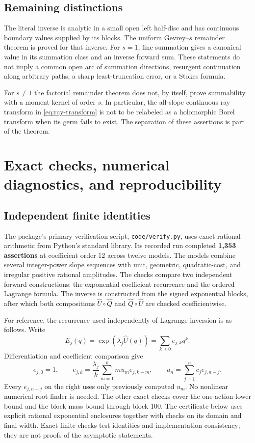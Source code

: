 \documentclass[11pt,a4paper]{article}
\numberwithin{equation}{section}
\theoremstyle{definition}
\theoremstyle{remark}
\theoremstyle{definition}
\newcommand{\U}{\widehat U}
\newcommand{\Q}{\widehat Q}
\begin{document}
\subsection{Remaining distinctions}
The literal inverse is analytic in a small open left half-disc and has
continuous boundary values supplied by its blocks. The uniform
Gevrey--$s$ remainder theorem is proved for that inverse. For $s=1$,
fine summation gives a canonical value in its summation class and an
inverse forward sum. These statements do not imply a common open arc
of summation directions, resurgent continuation along arbitrary paths,
a sharp least-truncation error, or a Stokes formula.

For $s\ne1$ the factorial remainder theorem does not, by itself, prove
summability with a moment kernel of order $s$. In particular, the
all-slope continuous ray transform in \eqref{eq:ray-transform} is not
to be relabeled as a holomorphic Borel transform when its germ fails
to exist. The separation of these assertions is part of the theorem.

\section{Exact checks, numerical diagnostics, and reproducibility}
\label{sec:verification}

\subsection{Independent finite identities}
The package's primary verification script, \texttt{code/verify.py},
uses exact rational arithmetic from Python's standard library. Its
recorded run completed \textbf{1,353 assertions} at coefficient order
12 across twelve models. The models combine several integer-power
slope sequences with unit, geometric, quadratic-cost, and irregular
positive rational amplitudes. The checks compare two independent
forward constructions: the exponential coefficient recurrence and the
ordered Lagrange formula. The inverse is constructed from the signed
exponential blocks, after which both compositions $\U\circ\Q$ and
$\Q\circ\U$ are checked coefficientwise.

For reference, the recurrence used independently of Lagrange inversion
is as follows. Write
\[
 E_j(q)=\exp(\lambda_j\U(q))=\sum_{k\ge0}e_{j,k}q^k.
\]
Differentiation and coefficient comparison give
\begin{equation}
 e_{j,0}=1,\qquad
 e_{j,k}=\frac{\lambda_j}{k}\sum_{m=1}^k m u_m e_{j,k-m},
 \qquad
 u_n=\sum_{j=1}^n c_j e_{j,n-j}.
 \label{eq:algorithm}
\end{equation}
Every $e_{j,n-j}$ on the right uses only previously computed $u_m$.
No nonlinear numerical root finder is needed. The other exact checks
cover the one-action lower bound and the block mass bound through block
100. The certificate below uses explicit rational exponential
enclosures together with checks on its domain and final width. Exact finite checks test identities and implementation consistency;
they are not proofs of the asymptotic statements.
\end{document}
